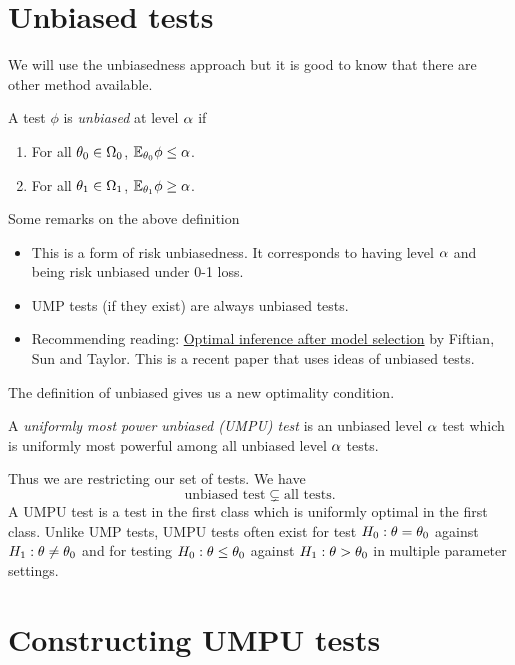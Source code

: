 \section{Unbiased tests}
We will use the unbiasedness approach but it is good to know that there are other method available. 
\begin{defn}
    A test $\phi$ is \emph{unbiased} at level ${\alpha}$ if
    \begin{enumerate}
        \item For all ${\theta}_0 \in {{\Omega}}_0$, ${\mathbb{E}}_{{\theta}_0} \phi \le {\alpha}$.
        \item For all ${\theta}_1 \in {{\Omega}}_1$, ${\mathbb{E}}_{{\theta}_1} \phi \ge {\alpha}$.
    \end{enumerate}
\end{defn}
\begin{remark}
    Some remarks on the above definition
    \begin{itemize}
        \item This is a form of risk unbiasedness. It corresponds to having level ${\alpha}$ and being risk unbiased under 0-1 loss.
        \item UMP tests (if they exist) are always unbiased tests.
        \item Recommending reading: \href{https://arxiv.org/abs/1410.2597}{Optimal inference after model selection} by Fiftian, Sun and Taylor. This is a recent paper that uses ideas of unbiased tests.
    \end{itemize}
\end{remark}
The definition of unbiased gives us a new optimality condition. 
\begin{defn}
    A \emph{uniformly most power unbiased (UMPU) test} is an unbiased level ${\alpha}$ test which is uniformly most powerful among all unbiased level ${\alpha}$ tests.
\end{defn}
Thus we are restricting our set of tests. We have 
\[\text{unbiased test} \subsetneq \text{all tests}. \]
A UMPU test is a test in the first class which is uniformly optimal in the first class. Unlike UMP tests, UMPU tests often exist for test $H_0 : {\theta} ={\theta}_0$ against $H_1 : {\theta} \neq {\theta}_0$ and for testing $H_0 : {\theta} \le {\theta}_0$ against $H_1 : {\theta} > {\theta}_0$ in multiple parameter settings.
\section{Constructing UMPU tests}
